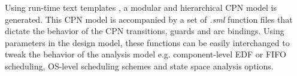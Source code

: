 Using run-time text templates \cite{T4TextTemplates}, a modular and hierarchical CPN model is generated. This CPN model is accompanied by a set of \emph{.sml} function files that dictate the behavior of the CPN transitions, guards and arc bindings. Using parameters in the design model, these functions can be easily interchanged to tweak the behavior of the analysis model e.g. component-level EDF or FIFO scheduling, OS-level scheduling schemes and state space analysis options.


